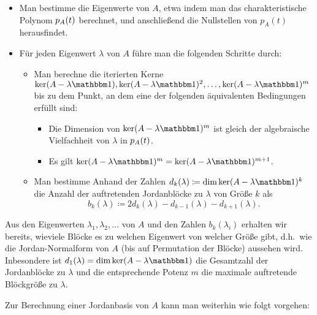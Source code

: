 \begin{itemize}
  \item
    Man bestimme die Eigenwerte von $A$, etwa indem man das charakteristische Polynom $p_{A}(t)$ berechnet, und anschließend die Nullstellen von $p_A(t)$ herausfindet.
    
  \item
    Für jeden Eigenwert $\lambda$ von $A$ führe man die folgenden Schritte durch:
    \begin{itemize}
      \item
        Man berechne die iterierten Kerne $\ker (A - \lambda \Id), \ker (A - \lambda \Id)^2, \dotsc, \ker (A - \lambda \Id)^m$ bis zu dem Punkt, an dem eine der folgenden äquivalenten Bedingungen erfüllt sind:
        \begin{itemize}
          \item
            Die Dimension von $\ker (A - \lambda \Id)^m$ ist gleich der algebraische Vielfachheit von $\lambda$ in $p_{A}(t)$.
          \item
            Es gilt $\ker (A - \lambda \Id)^m = \ker (A - \lambda \Id)^{m+1}$.
        \end{itemize}
      \item
        Man bestimme Anhand der Zahlen $d_k(\lambda) \coloneqq \dim \ker (A - \lambda \Id)^k$ die Anzahl der auftretenden Jordanblöcke zu $\lambda$ von Größe $k$ als
        \[
          b_k(\lambda) \coloneqq 2 d_k(\lambda) - d_{k-1}(\lambda) - d_{k+1}(\lambda).
        \]
    \end{itemize}
\end{itemize}

Aus den Eigenwerten $\lambda_1, \lambda_2, \dotsc$ von $A$ und den Zahlen $b_k(\lambda_i)$ erhalten wir bereits, wieviele Blöcke es zu welchen Eigenwert von welcher Größe gibt, d.h.\ wie die Jordan-Normalform von $A$ (bis auf Permutation der Blöcke) aussehen wird.
Inbesondere ist $d_1(\lambda) = \dim \ker (A - \lambda \Id)$ die Gesamtzahl der Jordanblöcke zu $\lambda$ und die entsprechende Potenz $m$ die maximale auftretende Blöckgröße zu $\lambda$.

Zur Berechnung einer Jordanbasis von $A$ kann man weiterhin wie folgt vorgehen:

